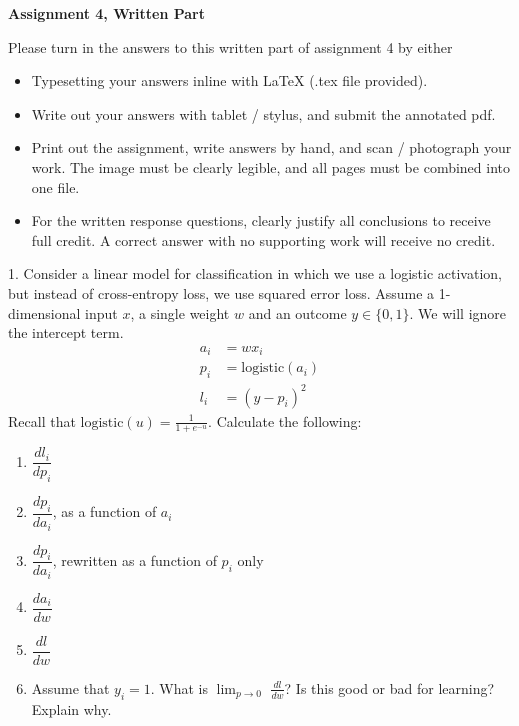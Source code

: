 \documentclass{article}
\begin{document}
\newpage
\begin{center}
  \bfseries\large
  Assignment 4, Written Part
\end{center}

\noindent

\vspace{20mm}

Please turn in the answers to this written part of assignment 4 by either 
 \begin{itemize}
     \item Typesetting your answers inline with LaTeX (.tex file provided).
     \item Write out your answers with tablet / stylus, and submit the annotated pdf.
     \item Print out the assignment, write answers by hand, and scan / photograph your work.  The image must be clearly legible, and all pages must be combined into one file.
     \item For the written response questions, clearly justify all conclusions to receive full credit. A correct answer with no supporting work will receive no credit.
 \end{itemize}

\newpage

1. Consider a linear model for classification in which we use a logistic activation, but instead of cross-entropy loss, we use squared error loss. Assume a 1-dimensional input $x$, a single weight $w$ and an outcome $y\in\{0,1\}$. We will ignore the intercept term.
\begin{align*}
a_i &= wx_i \\
p_{i}&=\mbox{logistic}\left(a_i\right) \\
l_{i}&=\left(y-p_{i}\right)^{2}
\end{align*}
Recall that $\mbox{logistic}\left(u\right)=\frac{1}{1+e^{-u}}$.
Calculate the following:

{
\renewcommand{\theenumi}{\alph{enumi}}
\begin{enumerate}
\item  $\dfrac{dl_i}{dp_i}$ \\
\item $\dfrac{dp_i}{da_i}$, as a function of $a_i$ \\
\item $\dfrac{dp_i}{da_i}$, rewritten as a function of $p_i$ only \\
\item $\dfrac{da_i}{dw}$ \\
\item $\dfrac{dl}{dw}$ \\
\item Assume that $y_i = 1$. What is $\lim_{p\rightarrow0}$ $\frac{dl}{dw}$? Is this good or bad for learning? Explain why.
\end{enumerate}
}
\end{document}
